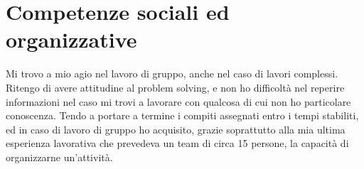 \section{Competenze sociali ed organizzative}
Mi trovo a mio agio nel lavoro di gruppo, anche nel caso di lavori complessi.\newline
Ritengo di avere attitudine al problem solving, e non ho difficoltà nel reperire
informazioni nel caso mi trovi a lavorare con qualcosa di cui non ho particolare conoscenza.\newline
Tendo a portare a termine i compiti assegnati entro i tempi stabiliti, ed in caso
di lavoro di gruppo ho acquisito, grazie soprattutto alla mia ultima esperienza lavorativa
che prevedeva un team di circa 15 persone, la capacit\`a di organizzarne un'attivit\`a.
